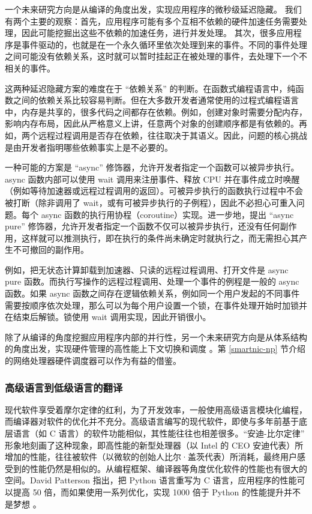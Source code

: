 一个未来研究方向是从编译的角度出发，实现应用程序的微秒级延迟隐藏。
我们有两个主要的观察：首先，应用程序可能有多个互相不依赖的硬件加速任务需要处理，因此可能挖掘出这些不依赖的加速任务，进行并发处理。
其次，很多应用程序是事件驱动的，也就是在一个永久循环里依次处理到来的事件。不同的事件处理之间可能没有依赖关系，这时就可以暂时挂起正在被处理的事件，去处理下一个不相关的事件。

这两种延迟隐藏方案的难度在于 ``依赖关系'' 的判断。在函数式编程语言中，纯函数之间的依赖关系比较容易判断。但在大多数开发者通常使用的过程式编程语言中，内存是共享的，很多代码之间都存在依赖。例如，创建对象时需要分配内存，影响内存布局，因此从严格意义上讲，任意两个对象的创建顺序都是有依赖的。再如，两个远程过程调用是否存在依赖，往往取决于其语义。因此，问题的核心挑战是由开发者指明哪些依赖事实上是不必要的。

一种可能的方案是 ``async'' 修饰器，允许开发者指定一个函数可以被异步执行。async 函数内部可以使用 wait 调用来注册事件、释放 CPU 并在事件成立时唤醒（例如等待加速器或远程过程调用的返回）。可被异步执行的函数执行过程中不会被打断（除非调用了 wait，或有可被异步执行的子例程），因此不必担心可重入问题。每个 async 函数的执行用协程（coroutine）实现。进一步地，提出 ``async pure'' 修饰器，允许开发者指定一个函数不仅可以被异步执行，还没有任何副作用，这样就可以推测执行，即在执行的条件尚未确定时就执行之，而无需担心其产生不可撤回的副作用。

例如，把无状态计算卸载到加速器、只读的远程过程调用、打开文件是 async pure 函数。而执行写操作的远程过程调用、处理一个事件的例程是一般的 async 函数。如果 async 函数之间存在逻辑依赖关系，例如同一个用户发起的不同事件需要按顺序依次处理，那么可以为每个用户设置一个锁，在事件处理开始时加锁并在结束后解锁。锁使用 wait 调用实现，因此开销很小。

除了从编译的角度挖掘应用程序内部的并行性，另一个未来研究方向是从体系结构的角度出发，实现硬件管理的高性能上下文切换和调度 \cite{barroso2017attack}。第 \ref{smartnic-np} 节介绍的网络处理器硬件调度器可以作为有益的借鉴。

\iffalse
\subsubsection{高级语言到低级语言的翻译}
\label{future:high-to-low}

现代软件享受着摩尔定律的红利，为了开发效率，一般使用高级语言模块化编程，而编译器对软件的优化并不充分。高级语言编写的现代软件，即使与多年前基于底层语言（如 C 语言）的软件功能相似，其性能往往也相差很多。``安迪-比尔定律'' \cite{langchaozhidian} 形象地刻画了这种现象，即高性能的新型处理器（以 Intel 的 CEO 安迪代表）所增加的性能，往往被软件（以微软的创始人比尔·盖茨代表）所消耗，最终用户感受到的性能仍然是相似的。从编程框架、编译器等角度优化软件的性能也有很大的空间。David Patterson 指出，把 Python 语言重写为 C 语言，应用程序的性能可以提高 50 倍，而如果使用一系列优化，实现 1000 倍于 Python 的性能提升并不是梦想 \cite{python-to-c}。

